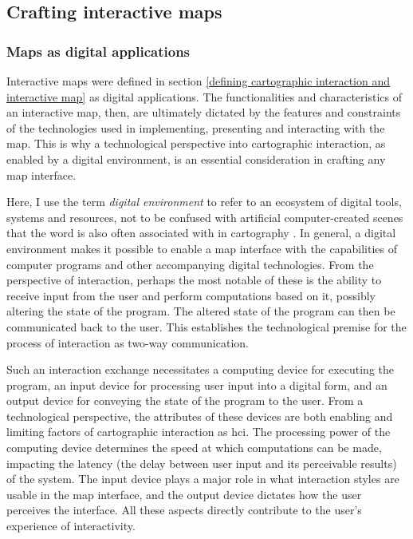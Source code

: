 \subsection{Crafting interactive maps}



\subsubsection{Maps as digital applications}
\label{maps as digital applications}

Interactive maps were defined in
section \ref{defining cartographic interaction and interactive map}
as digital applications.
The functionalities and characteristics of an interactive map, then,
are ultimately dictated by the features and constraints of the technologies
used in implementing, presenting and interacting with the map.
This is why a technological perspective into
cartographic interaction, as enabled by a digital environment,
is an essential consideration in crafting any map interface.

Here, I use the term \textit{digital environment} to refer to
an ecosystem of digital tools, systems and resources,
not to be confused with artificial computer-created scenes
that the word is also often associated with in cartography \parencite{kon2011}.
In general, a digital environment makes it possible to enable a map interface with
the capabilities of computer programs and other accompanying digital technologies.
From the perspective of interaction, perhaps the most notable of these
is the ability to receive input from the user and perform computations based on it,
possibly altering the state of the program.
The altered state of the program can then be communicated back to the user.
This establishes the technological premise for
the process of interaction as two-way communication.

Such an interaction exchange necessitates a computing device for executing the program,
an input device for processing user input into a digital form,
and an output device for conveying the state of the program to the user.
From a technological perspective,
the attributes of these devices are both enabling and limiting factors of
cartographic interaction as \acrshort{hci}.
The processing power of the computing device determines the speed at which
computations can be made, impacting the latency
(the delay between user input and its perceivable results)
of the system.
The input device plays a major role in what interaction styles
are usable in the map interface,
and the output device dictates how the user perceives the interface.
All these aspects directly contribute to the user's experience of interactivity.  %

